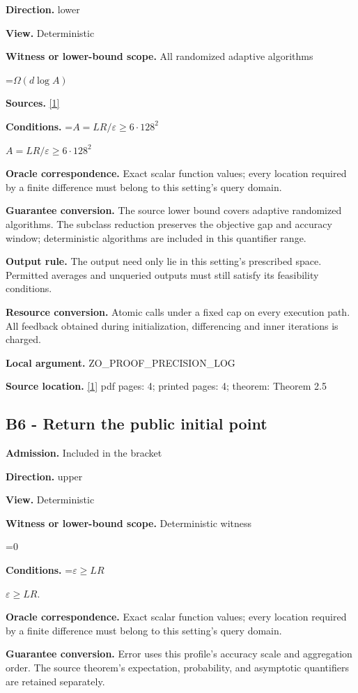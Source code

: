 \documentclass[10pt,a4paper]{article}
\newcommand{\AtlasMath}[1]{\par\begingroup\centering\setbox0=\hbox{$\displaystyle #1$}\ifdim\wd0>1.4\linewidth\typeout{ATLAS WIDE FORMULA: \the\wd0}\fi\ifdim\wd0>\linewidth\resizebox{\linewidth}{!}{\box0}\else\box0\fi\par\endgroup}
\newcommand{\AtlasInlineMath}[1]{\begingroup\setbox0=\hbox{$#1$}\ifdim\wd0>.4\linewidth\endgroup\AtlasMath{#1}\else\endgroup$#1$\fi}
\begin{document}
\textbf{Direction.} lower

\textbf{View.} Deterministic

\textbf{Witness or lower-bound scope.} All randomized adaptive algorithms

\AtlasMath{\Omega(d\log A)}
\textbf{Sources.} \href{https://arxiv.org/html/2610.00345v1}{[1]}

\textbf{Conditions.} \AtlasInlineMath{A=LR/\varepsilon\ge6\cdot128^2}

\textbf{Oracle correspondence.} Exact scalar function values; every location required by a finite difference must belong to this setting's query domain.

\textbf{Guarantee conversion.} The source lower bound covers adaptive randomized algorithms. The subclass reduction preserves the objective gap and accuracy window; deterministic algorithms are included in this quantifier range.

\textbf{Output rule.} The output need only lie in this setting's prescribed space. Permitted averages and unqueried outputs must still satisfy its feasibility conditions.

\textbf{Resource conversion.} Atomic calls under a fixed cap on every execution path. All feedback obtained during initialization, differencing and inner iterations is charged.

\textbf{Local argument.} ZO\_\allowbreak{}PROOF\_\allowbreak{}PRECISION\_\allowbreak{}LOG

\textbf{Source location.} \href{https://arxiv.org/html/2610.00345v1}{[1]} pdf pages: 4; printed pages: 4; theorem: Theorem 2.5

\subsection{B6 - Return the public initial point}
\textbf{Admission.} Included in the bracket

\textbf{Direction.} upper

\textbf{View.} Deterministic

\textbf{Witness or lower-bound scope.} Deterministic witness

\AtlasMath{0}
\textbf{Conditions.} \AtlasInlineMath{\varepsilon\ge LR}.

\textbf{Oracle correspondence.} Exact scalar function values; every location required by a finite difference must belong to this setting's query domain.

\textbf{Guarantee conversion.} Error uses this profile's accuracy scale and aggregation order. The source theorem's expectation, probability, and asymptotic quantifiers are retained separately.
\end{document}
